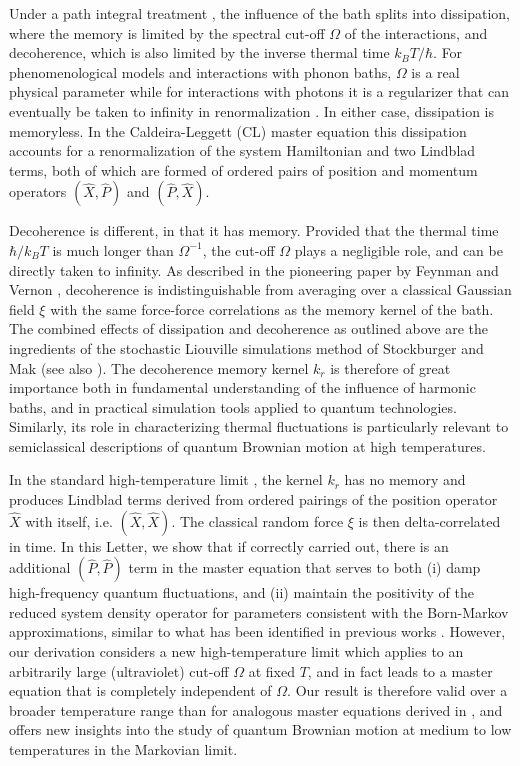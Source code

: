 \documentclass[prl,twocolumn,superscriptaddress,amsmath,amssymb]{revtex4-2}
\newcommand{\hb}{\hbar}
\begin{document}
Under a path integral treatment \cite{Kleinert2009}, the influence of the bath splits into dissipation, where the memory is limited by the spectral cut-off $\Omega$ of the interactions, and decoherence, which is also limited by the inverse thermal time $k_B T/\hb$. For phenomenological models and interactions with phonon baths, $\Omega$ is a real physical parameter while for interactions with photons it is a regularizer that can eventually be taken to infinity in renormalization \cite{Breuer2001,Baym2009}. In either case, dissipation is memoryless. In the Caldeira-Leggett (CL) master equation \cite{CaldeiraLeggettA} this dissipation accounts for a renormalization of the system Hamiltonian and two Lindblad terms, both of which are formed of ordered pairs of position and momentum operators $(\hat{X},\hat{P})$ and $(\hat{P},\hat{X})$.

Decoherence is different, in that it has memory. Provided that the thermal time $\hb/k_B T$ is much longer than $\Omega^{-1}$, the cut-off $\Omega$ plays a negligible role, and can be directly taken to infinity.
As described in the pioneering paper by Feynman and Vernon \cite{FeynmanVernon}, decoherence is indistinguishable from averaging over a classical Gaussian field $\xi$ with the same force-force correlations as the memory kernel of the bath. The combined effects of dissipation and decoherence as outlined above are the ingredients of the stochastic Liouville simulations method of Stockburger and Mak \cite{StockburgerMak1999} (see also \cite{Stockburger1998,Stockburger2002}). The decoherence memory kernel $k_r$ is therefore of great importance both in fundamental understanding of the influence of harmonic baths, and in practical simulation tools applied to quantum technologies. Similarly, its role in characterizing thermal fluctuations is particularly relevant to semiclassical descriptions of quantum Brownian motion at high temperatures.

In the standard high-temperature limit \cite{CaldeiraLeggettA}, the kernel $k_r$ has no memory and produces Lindblad terms derived from ordered pairings of the position operator $\hat{X}$ with itself, i.e. $(\hat{X},\hat{X})$.
The classical random force $\xi$ is then delta-correlated in time. In this Letter, we show that if correctly carried out, there is an additional $(\hat{P},\hat{P})$ term in the master equation that serves to both (i) damp high-frequency quantum fluctuations, and (ii) maintain the positivity of the reduced system density operator for parameters consistent with the Born-Markov approximations, similar to what has been identified in previous works \cite{BP2002,Diosi1993,Diosi1993a,Halliwell1995,Gao1997,Ford1999,Vacchini2000,Petruccione2005}. However, our derivation considers a new high-temperature limit which applies to an arbitrarily large (ultraviolet) cut-off $\Omega$ at fixed $T$, and in fact leads to a master equation that is completely independent of $\Omega$. Our result is therefore valid over a broader temperature range than for analogous master equations derived in \cite{BP2002, Diosi1993,Diosi1993a}, and offers new insights into the study of quantum Brownian motion at medium to low temperatures in the Markovian limit. 
\end{document}
